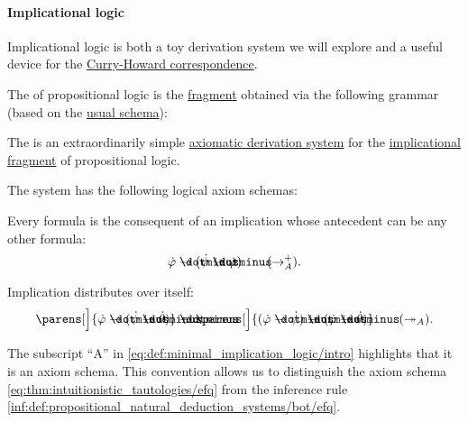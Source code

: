 \paragraph{Implicational logic}\hfill

Implicational logic is both a toy derivation system we will explore and a useful device for the \hyperref[con:curry_howard_correspondence]{Curry-Howard correspondence}.

\begin{definition}\label{def:implicational_propositional_fragment}
  The  of propositional logic is the \hyperref[def:propositional_syntax/fragment]{fragment} obtained via the following grammar (based on the \hyperref[def:propositional_syntax]{usual schema}):
  \begin{bnf*}
     { \bnfor \bnftsq{(} \bnfsp {} \bnfsp \bnftsq{\( \synimplies \)} \bnfsp {} \bnfsp \bnftsq{)}}
  \end{bnf*}
\end{definition}

\begin{definition}\label{def:minimal_implication_logic}
  The  is an extraordinarily simple \hyperref[def:axiomatic_derivation_system]{axiomatic derivation system} for the \hyperref[def:implicational_propositional_fragment]{implicational fragment} of propositional logic.

  The system has the following logical axiom schemas:
  \begin{thmenum}
     Every formula is the consequent of an implication whose antecedent can be any other formula:
    \begin{equation}\label{eq:def:minimal_implication_logic/intro}
      \syn\varphi \synimplies (\syn\psi \synimplies \syn\varphi) \tag{\( \rightarrow_A^+ \)}.
    \end{equation}

     Implication distributes over itself:
    \begin{equation}\label{eq:def:minimal_implication_logic/dist}
      \parens[\Big]{ \syn\varphi \synimplies (\syn\psi \synimplies \syn\theta) } \synimplies \parens[\Big]{ (\syn\varphi \synimplies \syn\psi) \synimplies (\syn\varphi \synimplies \syn\theta)} \tag{\( \twoheadrightarrow_A \)}.
    \end{equation}
  \end{thmenum}
\end{definition}
\begin{comments}
  \item The subscript \enquote{A} in \eqref{eq:def:minimal_implication_logic/intro} highlights that it is an axiom schema. This convention allows us to distinguish the axiom schema \eqref{eq:thm:intuitionistic_tautologies/efq} from the inference rule \ref{inf:def:propositional_natural_deduction_systems/bot/efq}.
\end{comments}

